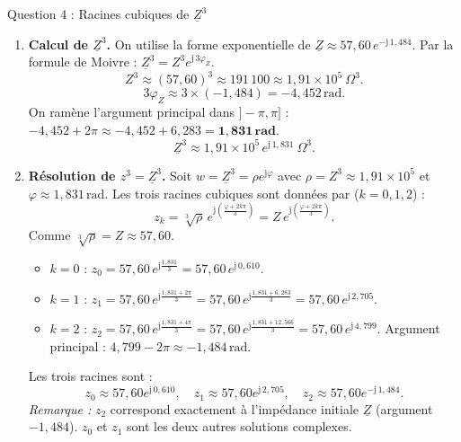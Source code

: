 \documentclass[11pt]{article}
\begin{document}
\begin{exoresolu}{Question 4 : Racines cubiques de $\underline{Z}^3$}
\begin{enumerate}
    \item \textbf{Calcul de $\underline{Z}^3$.}
    On utilise la forme exponentielle de $\underline{Z} \approx 57,60 \, e^{-\mathrm{j}\,1,484}$.
    Par la formule de Moivre : $\underline{Z}^3 = Z^3 e^{\mathrm{j}\,3\varphi_Z}$.
    \[
    Z^3 \approx (57,60)^3 \approx 191\,100 \approx 1,91 \times 10^5 \ \Omega^3.
    \]
    \[
    3\varphi_Z \approx 3 \times (-1,484) = -4,452\,\text{rad}.
    \]
    On ramène l'argument principal dans $]-\pi, \pi]$ : $-4,452 + 2\pi \approx -4,452 + 6,283 = \mathbf{1,831\,\text{rad}}$.
    \[
    \boxed{\underline{Z}^3 \approx 1,91 \times 10^5 \, e^{\mathrm{j}\,1,831} \ \Omega^3}.
    \]

    \item \textbf{Résolution de $z^3 = \underline{Z}^3$.}
    Soit $w = \underline{Z}^3 = \rho e^{\mathrm{j}\varphi}$ avec $\rho = Z^3 \approx 1,91 \times 10^5$ et $\varphi \approx 1,831\,\text{rad}$.
    Les trois racines cubiques sont données par ($k = 0, 1, 2$) :
    \[
    z_k = \sqrt[3]{\rho} \, e^{\mathrm{j}\left(\frac{\varphi + 2k\pi}{3}\right)} = Z \, e^{\mathrm{j}\left(\frac{\varphi + 2k\pi}{3}\right)}.
    \]
    Comme $\sqrt[3]{\rho} = Z \approx 57,60$.
    \begin{itemize}
        \item $k=0$ : $z_0 = 57,60 \, e^{\mathrm{j}\frac{1,831}{3}} = 57,60 \, e^{\mathrm{j}\,0,610}$.
        \item $k=1$ : $z_1 = 57,60 \, e^{\mathrm{j}\frac{1,831 + 2\pi}{3}} = 57,60 \, e^{\mathrm{j}\frac{1,831 + 6,283}{3}} = 57,60 \, e^{\mathrm{j}\,2,705}$.
        \item $k=2$ : $z_2 = 57,60 \, e^{\mathrm{j}\frac{1,831 + 4\pi}{3}} = 57,60 \, e^{\mathrm{j}\frac{1,831 + 12,566}{3}} = 57,60 \, e^{\mathrm{j}\,4,799}$.
              Argument principal : $4,799 - 2\pi \approx -1,484\,\text{rad}$.
    \end{itemize}
    Les trois racines sont :
    \[
    \boxed{z_0 \approx 57,60 e^{\mathrm{j}\,0,610},\quad z_1 \approx 57,60 e^{\mathrm{j}\,2,705},\quad z_2 \approx 57,60 e^{-\mathrm{j}\,1,484}}.
    \]
    \emph{Remarque :} $z_2$ correspond exactement à l'impédance initiale $\underline{Z}$ (argument $-1,484$). $z_0$ et $z_1$ sont les deux autres solutions complexes.


\end{enumerate}
\end{exoresolu}
\end{document}
